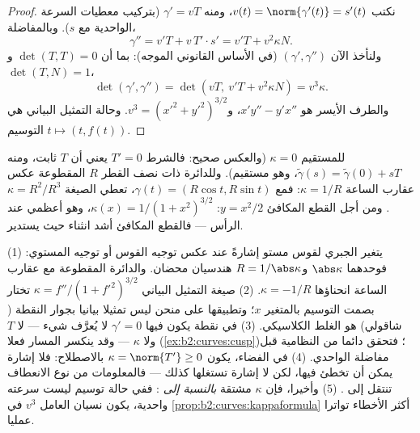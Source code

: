 \begin{proof}
نكتب $v(t) = \norm{\gamma'(t)} = s'(t)$، ومنه $\gamma' = vT$ (بتركيب معطيات السرعة الواحدية مع $s$).
وبالمفاضلة،
\[
\gamma'' = v'T + v\,T'\cdot s' = v'T + v^2\kappa N .
\]
ولنأخذ الآن  $(\gamma', \gamma'')$ (في الأساس القانوني الموجه): بما أن $\det(T, T) = 0$
و$\det(T, N) = 1$،
\[
\det(\gamma', \gamma'') = \det(vT,\ v'T + v^2\kappa N)
= v^3\kappa .
\]
والطرف الأيسر هو $x'y'' - y'x''$، و$v^3 = (x'^2 +
y'^2)^{3/2}$. وحالة التمثيل البياني هي التوسيم
$t \mapsto (t,
f(t))$.
\end{proof}

\begin{example}\label{ex:b2:curves:kappaexamples}
للمستقيم $\kappa = 0$ (والعكس صحيح: فالشرط $T' = 0$ يعني أن $T$ ثابت،
ومنه $\tilde\gamma(s) = \tilde\gamma(0) + sT$، وهو مستقيم). وللدائرة ذات نصف القطر $R$ المقطوعة
عكس عقارب الساعة $\kappa = 1/R$: فمع $\gamma(t) = (R\cos t, R\sin t)$، تعطي الصيغة $\kappa =
R^2/R^3$. ومن أجل
القطع المكافئ $y = x^2/2$: $\kappa(x) = 1/(1 +
x^2)^{3/2}$، وهو أعظمي عند الرأس --- فالقطع
المكافئ أشد انثناء حيث يستدير.
\end{example}

\begin{remark}
(1) يتغير  الجبري لقوس مستو إشارةً عند عكس توجيه القوس أو
توجيه المستوي: فوحدهما $\abs\kappa$ و$R = 1/\abs\kappa$ هندسيان محضان. والدائرة
المقطوعة مع عقارب الساعة انحناؤها $\kappa = -1/R$. (2) صيغة التمثيل البياني
$\kappa = f''/(1 + f'^2)^{3/2}$ تختار بصمت التوسيم بالمتغير $x$؛ وتطبيقها على منحن ليس
تمثيلا بيانيا بجوار النقطة ( شاقولي) هو الغلط الكلاسيكي. (3)
في نقطة يكون فيها $\gamma' = 0$ لا يُعرَّف شيء --- لا $T$ ولا $\kappa$
--- وقد ينكسر المسار فعلا (\cref{ex:b2:curves:cusp})؛ فتحقق دائما من النظامية قبل
مفاضلة  الواحدي. (4) في الفضاء، يكون $\kappa =
\norm{T'} \geq 0$ بالاصطلاح: فلا
إشارة يمكن أن تخطئ فيها، لكن لا إشارة تستغلها كذلك --- فالمعلومات
من نوع الانعطاف تنتقل إلى . (5) وأخيرا، فإن $\kappa$ مشتقة
\emph{بالنسبة إلى }: ففي حالة توسيم ليست سرعته واحدية، يكون
نسيان العامل $v^3$ في \cref{prop:b2:curves:kappaformula} أكثر الأخطاء تواترا عمليا.
\end{remark}

